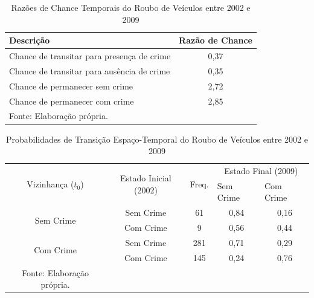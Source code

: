 \documentclass[12pt,openright,oneside,a4paper,english,french,spanish]{abntex2}
\numberwithin{table}{section} %
\numberwithin{figure}{section} %
\begin{document}
\begin{subappendices}
\begin{table}[H]
\centering
\caption{Razões de Chance Temporais do Roubo de Veículos entre 2002 e 2009}
        \begin{tabular}{lc}
            \hline
            {\textbf{Descrição}} & {\textbf{Razão de Chance}} \\\hline
            {Chance de transitar para presença de crime} & {0,37} \\
            {Chance de transitar para ausência de crime} & {0,35} \\
            {Chance de permanecer sem crime} & {2,72} \\
            {Chance de permanecer com crime} & {2,85} \\\hline
            \tiny Fonte: Elaboração própria.
        \end{tabular}
    \label{tab:odds_tempo_roub_vei_2002_2009}
\end{table}


\begin{table}[H]
\centering
\caption{Probabilidades de Transição Espaço-Temporal do Roubo de Veículos entre 2002 e 2009}
        \begin{tabular}{ccccc}
            \hline
            \multirow{2}{*}{Vizinhança ($t_0$)} & \multirow{2}{*}{Estado Inicial (2002)} & \multirow{2}{*}{Freq.} & \multicolumn{2}{c}{Estado Final (2009)}  \\\cline{4-5} %
                                        & & & \multicolumn{1}{l}{Sem Crime} & \multicolumn{1}{l}{Com Crime} \\\hline
            \multirow{2}{*}{Sem Crime} & {Sem Crime} & 61 &  {0,84} & {0,16} \\
                                       & {Com Crime} & 9 &   {0,56} & {0,44} \\\hline
            \multirow{2}{*}{Com Crime} & {Sem Crime} & 281 & {0,71} & {0,29} \\
                                       & {Com Crime} & 145 & {0,24} & {0,76} \\\hline
            \tiny Fonte: Elaboração própria.
        \end{tabular}
    \label{tab:prob_espaco_tempo_roub_vei_2002_2009}
\end{table}



\end{subappendices}
\end{document}
